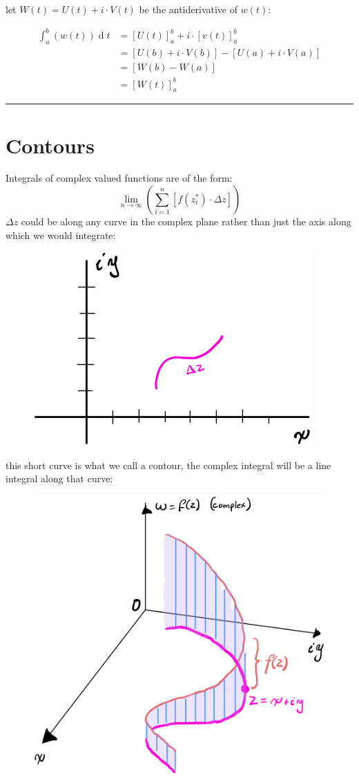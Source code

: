 \documentclass[class=article, crop=false]{standalone}
\begin{document}
        let $W\left( t \right) =  U\left( t \right) +  i \cdot  V\left( t \right) $ be the antiderivative of $w\left( t \right) $:

        \begin{align*}
          \int^{b}_{a}\left( w \left( t \right)  \right) \operatorname{d}t &= \left[ U\left( t \right)  \right]^b_a + i\cdot \left[ v\left( t \right)  \right]^b_a \\
          &= \left[ U\left( b \right) + i\cdot V\left( b \right)  \right] -\left[ U\left( a \right) +  i \cdot V\left( a \right)  \right]  \\
          &= \left[ W\left( b \right) - W\left( a \right)  \right] \\
          &= \left[ W\left( t \right)  \right]^b_a
        \end{align*}
        \begin{flushright}
        {\rule{0.7em}{0.7em}}
        \end{flushright}
         
        \section{Contours}
        Integrals of complex valued functions are of the form:
        \[
          \lim_{n     \rightarrow \infty}\left( \sum^{n}_{i= 1}\left[ f\left( z^*_i \right) \cdot \Delta z \right]  \right)
        \]
         $\Delta z$ could be along any curve in the complex plane rather than just the axis along which we would integrate:
        
\begin{figure}[h!]
	
	\includegraphics[width=0.3\linewidth]{./media/CompexIntegrals/handwriting.png}



	\label{fig:handwriting}
\end{figure}

this short curve is what we call a contour, the complex integral will be a line integral along that curve:


\begin{figure}[h!]
	\centering
	\includegraphics[width=0.3\linewidth]{"./media/CompexIntegrals/handwriting2.png"}
	\caption{}
	\label{fig:handwriting-2}
\end{figure}
\end{document}
